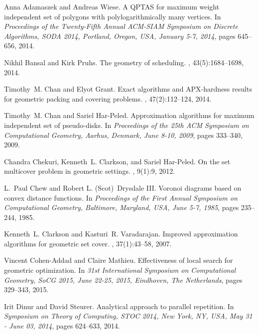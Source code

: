 \documentclass[a4paper,11pt]{article}
\begin{document}
\begin{thebibliography}{10}

Anna Adamaszek and Andreas Wiese.
\newblock A {QPTAS} for maximum weight independent set of polygons with
  polylogarithmically many vertices.
\newblock In {\em Proceedings of the Twenty-Fifth Annual {ACM-SIAM} Symposium
  on Discrete Algorithms, {SODA} 2014, Portland, Oregon, USA, January 5-7,
  2014}, pages 645--656, 2014.

Nikhil Bansal and Kirk Pruhs.
\newblock The geometry of scheduling.
, 43(5):1684--1698, 2014.

Timothy~M. Chan and Elyot Grant.
\newblock Exact algorithms and {APX}-hardness results for geometric packing and
  covering problems.
, 47(2):112--124, 2014.

Timothy~M. Chan and Sariel Har{-}Peled.
\newblock Approximation algorithms for maximum independent set of pseudo-disks.
\newblock In {\em Proceedings of the 25th {ACM} Symposium on Computational
  Geometry, Aarhus, Denmark, June 8-10, 2009}, pages 333--340, 2009.

Chandra Chekuri, Kenneth~L. Clarkson, and Sariel Har{-}Peled.
\newblock On the set multicover problem in geometric settings.
, 9(1):9, 2012.

L.~Paul Chew and Robert L. (Scot)~Drysdale III.
\newblock Voronoi diagrams based on convex distance functions.
\newblock In {\em Proceedings of the First Annual Symposium on Computational
  Geometry, Baltimore, Maryland, USA, June 5-7, 1985}, pages 235--244, 1985.

Kenneth~L. Clarkson and Kasturi~R. Varadarajan.
\newblock Improved approximation algorithms for geometric set cover.
, 37(1):43--58, 2007.

Vincent Cohen{-}Addad and Claire Mathieu.
\newblock Effectiveness of local search for geometric optimization.
\newblock In {\em 31st International Symposium on Computational Geometry, SoCG
  2015, June 22-25, 2015, Eindhoven, The Netherlands}, pages 329--343, 2015.

Irit Dinur and David Steurer.
\newblock Analytical approach to parallel repetition.
\newblock In {\em Symposium on Theory of Computing, {STOC} 2014, New York, NY,
  USA, May 31 - June 03, 2014}, pages 624--633, 2014.


\end{thebibliography}
\end{document}
